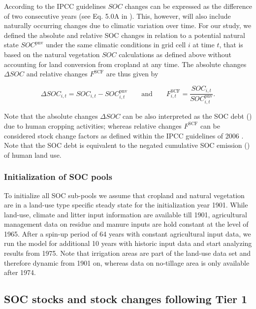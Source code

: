 \documentclass[gc, manuscript]{copernicus}
\begin{document}
According to the IPCC guidelines \(SOC\) changes can be expressed as the difference of two consecutive years (see Eq. 5.0A in \citep{calvo_buendia_ipcc_2019}). This, however, will also include naturally occurring changes due to climatic variation over time. For our study, we defined the absolute and relative SOC changes in relation to a potential natural state \(SOC^{\mathrm{pnv}}\) under the same climatic conditions in grid cell \(i\) at time \(t\), that is based on the natural vegetation \(SOC\) calculations as defined above without accounting for land conversion from cropland at any time. The absolute changes \(\Delta SOC\) and relative changes \(F^{\mathrm{SCF}}\) are thus given by

\begin{equation}
\Delta SOC_{i,t} = SOC_{i,t} - SOC^{\mathrm{pnv}}_{i,t}\qquad \text{and} \qquad  F^{\mathrm{SCF}}_{i,t} = \frac{SOC_{i,t}}{SOC^{\mathrm{pnv}}_{i,t}} .
\label{eq:stockdiff}
\end{equation}

Note that the absolute changes \(\Delta SOC\) can be also interpreted as the SOC debt (\citep{sanderman_soil_2017}) due to human cropping activities; whereas relative changes \(F^{\mathrm{SCF}}\) can be considered stock change factors as defined within the IPCC guidelines of 2006 \citep{eggleston_hs_ipcc_2006}. Note that the SOC debt is equivalent to the negated cumulative SOC emission (\citep{pugh_simulated_2015}) of human land use.

\hypertarget{sec:initsoc}{%
\subsubsection{Initialization of SOC pools}\label{sec:initsoc}}

To initialize all SOC sub-pools we assume that cropland and natural vegetation are in a land-use type specific steady state for the initialization year 1901. While land-use, climate and litter input information are available till 1901, agricultural management data on residue and manure inputs are hold constant at the level of 1965. After a spin-up period of 64 years with constant agricultural input data, we run the model for additional 10 years with historic input data and start analyzing results from 1975. Note that irrigation areas are part of the land-use data set and therefore dynamic from 1901 on, whereas data on no-tillage area is only available after 1974.

\hypertarget{sec:tier1}{%
\subsection{SOC stocks and stock changes following Tier 1}\label{sec:tier1}}
\end{document}
